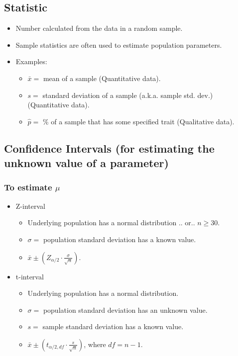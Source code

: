 \documentclass{report}
\begin{document}
\subsection*{Statistic}
\begin{itemize}
    \item Number calculated from the data in a random sample.
    \item Sample statistics are often used to estimate population parameters.
    \item Examples:
    \begin{itemize}
        \item $\bar{x} = $ mean of a sample (Quantitative data).
        \item $s = $ standard deviation of a sample (a.k.a. sample std. dev.) (Quantitative data).
        \item $\hat{p} = $ \% of a sample that has some specified trait (Qualitative data).
    \end{itemize}
\end{itemize}

\subsection*{Confidence Intervals (for estimating the unknown value of a parameter)}
\subsubsection*{To estimate $\mu$}
\begin{itemize}
    \item Z-interval
    \begin{itemize}
        \item Underlying population has a normal distribution .. or.. $n \geq 30$.
        \item $\sigma = $ population standard deviation has a known value.
        \item $\bar{x} \pm \left(Z_{\alpha/2} \cdot \frac{\sigma}{\sqrt{n}}\right)$.
    \end{itemize}
    \item t-interval
    \begin{itemize}
        \item Underlying population has a normal distribution.
        \item $\sigma = $ population standard deviation has an unknown value.
        \item $s = $ sample standard deviation has a known value.
        \item $\bar{x} \pm \left(t_{\alpha/2, df} \cdot \frac{s}{\sqrt{n}}\right)$, where $df = n - 1$.
    \end{itemize}
\end{itemize}
\end{document}
